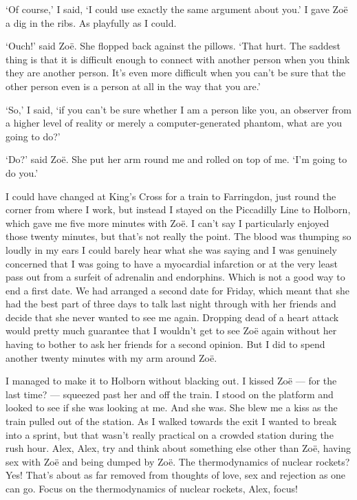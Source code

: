 `Of course,' I said, `{\twelveit I\/} could use exactly the same
argument about {\twelveit you}.' I gave Zoë a dig in the ribs.
As playfully as I could.

`Ouch!' said Zoë. She flopped back against the pillows. `That
hurt. The saddest thing is that it is difficult enough to connect
with another person when you think they are another person. It's
even more difficult when you can't be sure that the other person
even {\twelveit is\/} a person at all in the way that you are.'

`So,' I said, `if you can't be sure whether I am a person like you,
an observer from a higher level of reality or merely a
computer-generated phantom, what are you going to do?'

`Do?' said Zoë. She put her arm round me and rolled on top of
me. `I'm going to do you.'

\vskip 1cm

I could have changed at King's Cross for a train to Farringdon, just
round the corner from where I work, but instead I stayed on the
Piccadilly Line to Holborn, which gave me five more minutes with
Zoë. I can't say I particularly enjoyed those twenty minutes,
but that's not really the point. The blood was thumping so loudly in
my ears I could barely hear what she was saying and I was genuinely
concerned that I was going to have a myocardial infarction or at the
very least pass out from a surfeit of adrenalin and endorphins.
Which is not a good way to end a first date. We had arranged a
second date for Friday, which meant that she had the best part of
three days to talk last night through with her friends and decide
that she never wanted to see me again. Dropping dead of a heart
attack would pretty much guarantee that I wouldn't get to see
Zoë again without her having to bother to ask her friends for a
second opinion. But I did to spend another twenty minutes with my arm around
Zoë.

I managed to make it to Holborn without blacking out. I kissed
Zoë --- for the last time? --- squeezed past her and off the
train. I stood on the platform and looked to see if she was looking
at me. And she was. She blew me a kiss as the train pulled out of
the station. As I walked towards the exit I wanted to break into a
sprint, but that wasn't really practical on a crowded station during
the rush hour. Alex, Alex, try and think about something else other
than Zoë, having sex with Zoë and being dumped by Zoë.
The thermodynamics of nuclear rockets? Yes! That's about as far
removed from thoughts of love, sex and rejection as one can go.
Focus on the thermodynamics of nuclear rockets, Alex, focus!

